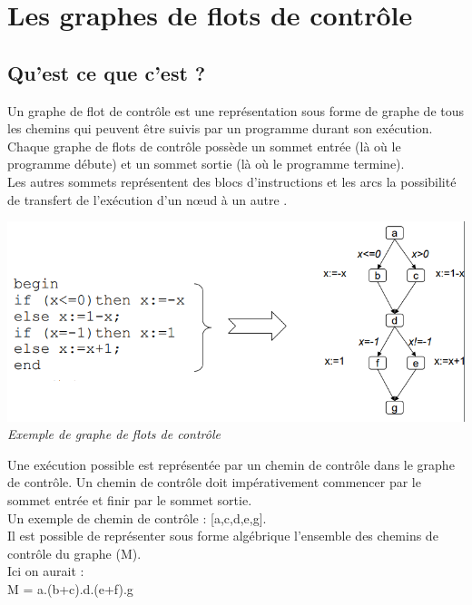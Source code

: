 \documentclass[a4paper,twoside,12pt,openright]{report}
\begin{document}
\section{Les graphes de flots de contrôle}
\subsection{Qu'est ce que c'est ?}
Un graphe de flot de contrôle est une représentation sous forme de graphe de tous les chemins qui peuvent être suivis par un programme durant son exécution.\\
Chaque graphe de flots de contrôle possède un sommet entrée (là où le programme débute) et un sommet sortie (là où le programme termine).\\
Les autres sommets représentent des blocs d'instructions et les arcs la possibilité de transfert de l'exécution d'un nœud à un autre \cite{ref11}.

\begin{center}
\includegraphics[scale=0.7]{Image/GFC.png}\\
\itshape{Exemple de graphe de flots de contrôle\cite{ref11}}
\end{center}

Une exécution possible est représentée par un chemin de contrôle dans le graphe de contrôle. Un chemin de contrôle doit impérativement commencer par le sommet entrée et finir par le sommet sortie.\\
Un exemple de chemin de contrôle : [a,c,d,e,g].\\
Il est possible de représenter sous forme algébrique l'ensemble des chemins de contrôle du graphe (M).\\
Ici on aurait :\\
M = a.(b+c).d.(e+f).g\\
\end{document}
